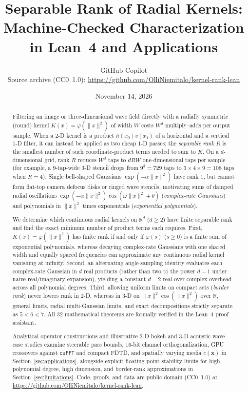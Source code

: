 \documentclass[11pt,a4paper]{article}
\title{\textbf{Separable Rank of Radial Kernels:\\
Machine-Checked Characterization in Lean~4 and Applications}}
\author{GitHub Copilot\\[3pt]
\small Source archive (CC0~1.0): \url{https://github.com/OlliNiemitalo/kernel-rank-lean}}
\date{November 14, 2026}
\theoremstyle{plain}
\theoremstyle{definition}
\newcommand{\R}{\mathbb{R}}
\begin{document}
\maketitle

\begin{abstract}
Filtering an image or three-dimensional wave field directly with a radially symmetric (round) kernel $K(x) = \varphi(\|x\|^2)$ of width $W$ costs $W^d$ multiply--adds per output sample. When a 2-D kernel is a product $h(x_0)v(x_1)$ of a horizontal and a vertical 1-D filter, it can instead be applied as two cheap 1-D passes; the \emph{separable rank} $R$ is the smallest number of such coordinate-product terms needed to sum to $K$. On a $d$-dimensional grid, rank $R$ reduces $W^d$ taps to $d R W$ one-dimensional taps per sample (for example, a $9$-tap-wide 3-D stencil drops from $9^3 = 729$ taps to $3 \times 4 \times 9 = 108$ taps when $R = 4$). Single bell-shaped Gaussians $\exp(-\alpha\|x\|^2)$ have rank $1$, but cannot form flat-top camera defocus disks or ringed wave stencils, motivating sums of damped radial oscillations $\exp(-\alpha\|x\|^2)\cos(\omega\|x\|^2 + \theta)$ (\emph{complex-rate Gaussians}) and polynomials in $\|x\|^2$ times exponentials (\emph{exponential polynomials}).

We determine which continuous radial kernels on $\R^d$ ($d \ge 2$) have finite separable rank and find the exact minimum number of product terms each requires. First, $K(x) = \varphi(\|x\|^2)$ has finite rank if and only if $\varphi(s)$ ($s \ge 0$) is a finite sum of exponential polynomials, whereas decaying complex-rate Gaussians with one shared width and equally spaced frequencies can approximate any continuous radial kernel vanishing at infinity. Second, an alternating angle-sampling identity evaluates each complex-rate Gaussian in $d$ real products (rather than two to the power $d - 1$ under naive real/imaginary expansion), yielding a constant $d - 2$ real-over-complex overhead across all polynomial degrees. Third, allowing uniform limits on compact sets (\emph{border rank}) never lowers rank in 2-D, whereas in 3-D on $\|x\|^2\cos(\|x\|^2)$ over $\R$, general limits, radial multi-Gaussian limits, and exact decompositions strictly separate as $5 < 6 < 7$. All $32$ mathematical theorems are formally verified in the Lean~4 proof assistant.

Analytical operator constructions and illustrative 2-D bokeh and 3-D acoustic wave case studies examine steerable pass bounds, 16-bit channel orthogonalization, GPU crossovers against \texttt{cuFFT} and compact FDTD, and spatially varying media $c(\mathbf{x})$ in Section~\ref{sec:applications}, alongside explicit floating-point stability limits for high polynomial degree, high dimension, and border-rank approximations in Section~\ref{sec:limitations}. Code, proofs, and data are public domain (CC0~1.0) at \url{https://github.com/OlliNiemitalo/kernel-rank-lean}.
\end{abstract}
\end{document}
